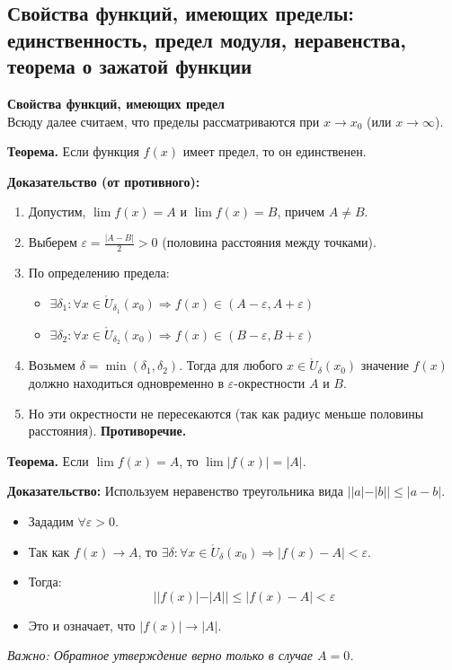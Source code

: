 \subsection{Свойства функций, имеющих пределы: единственность, предел модуля, неравенства, теорема о зажатой функции}

\textbf{Свойства функций, имеющих предел}\\
Всюду далее считаем, что пределы рассматриваются при $x \to x_0$ (или $x \to \infty$).

\textbf{Теорема.} Если функция $f(x)$ имеет предел, то он единственен.
\begin{tcolorbox}[title=1. Единственность предела]	
	\textbf{Доказательство (от противного):}
	\begin{enumerate}
		\item Допустим, $\lim f(x) = A$ и $\lim f(x) = B$, причем $A \neq B$.
		\item Выберем $\varepsilon = \frac{|A - B|}{2} > 0$ (половина расстояния между точками).
		\item По определению предела:
		\begin{itemize}
			\item $\exists \delta_1: \forall x \in \mathring{U}_{\delta_1}(x_0) \Rightarrow f(x) \in (A-\varepsilon, A+\varepsilon)$
			\item $\exists \delta_2: \forall x \in \mathring{U}_{\delta_2}(x_0) \Rightarrow f(x) \in (B-\varepsilon, B+\varepsilon)$
		\end{itemize}
		\item Возьмем $\delta = \min(\delta_1, \delta_2)$. Тогда для любого $x \in \mathring{U}_\delta(x_0)$ значение $f(x)$ должно находиться одновременно в $\varepsilon$-окрестности $A$ и $B$.
		\item Но эти окрестности не пересекаются (так как радиус меньше половины расстояния). \textbf{Противоречие.}
	\end{enumerate}
\end{tcolorbox}

\textbf{Теорема.} Если $\lim f(x) = A$, то $\lim |f(x)| = |A|$.
\begin{tcolorbox}[title=2. Предел модуля]
	
	\textbf{Доказательство:}
	Используем неравенство треугольника вида $||a| - |b|| \leq |a - b|$.
	\begin{itemize}
		\item Зададим $\forall \varepsilon > 0$.
		\item Так как $f(x) \to A$, то $\exists \delta: \forall x \in \mathring{U}_\delta(x_0) \Rightarrow |f(x) - A| < \varepsilon$.
		\item Тогда:
		$$ ||f(x)| - |A|| \leq |f(x) - A| < \varepsilon $$
		\item Это и означает, что $|f(x)| \to |A|$.
	\end{itemize}
	\textit{Важно: Обратное утверждение верно только в случае $A=0$.}
\end{tcolorbox}

